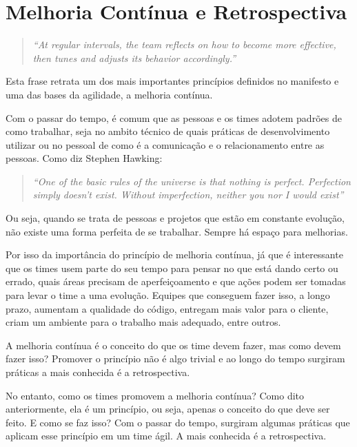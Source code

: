 \section{Melhoria Contínua e Retrospectiva}

\begin{quote}
\textit{``At regular intervals, the team reflects on how to become more effective, then tunes and adjusts its behavior accordingly.''}~\cite{manifesto}
\end{quote}

Esta frase retrata um dos mais importantes princípios definidos no manifesto e uma das bases da agilidade, a melhoria contínua. 

Com o passar do tempo, é comum que as pessoas e os times adotem padrões de como trabalhar, seja no ambito técnico de quais práticas de desenvolvimento utilizar ou no pessoal de como é a comunicação e o relacionamento entre as pessoas. Como diz Stephen Hawking:

\begin{quote}
\textit{``One of the basic rules of the universe is that nothing is perfect. Perfection simply doesn't exist. Without imperfection, neither you nor I would exist''}
\end{quote}

Ou seja, quando se trata de pessoas e projetos que estão em constante evolução, não existe uma forma perfeita de se trabalhar. Sempre há espaço para melhorias.

Por isso da importância do princípio de melhoria contínua, já que é interessante que os times usem parte do seu tempo para pensar no que está dando certo ou errado, quais áreas precisam de aperfeiçoamento e que ações podem ser tomadas para levar o time a uma evolução. Equipes que conseguem fazer isso, a longo prazo, aumentam a qualidade do código, entregam mais valor para o cliente, criam um ambiente para o trabalho mais adequado, entre outros.

A melhoria contínua é o conceito do que os time devem fazer, mas como devem fazer isso? Promover o princípio não é algo trivial e ao longo do tempo surgiram práticas a mais conhecida é a retrospectiva.

No entanto, como os times promovem a melhoria contínua? Como dito anteriormente, ela é um princípio, ou seja, apenas o conceito do que deve ser feito. E como se faz isso? Com o passar do tempo, surgiram algumas práticas que aplicam esse princípio em um time ágil. A mais conhecida é a retrospectiva.

